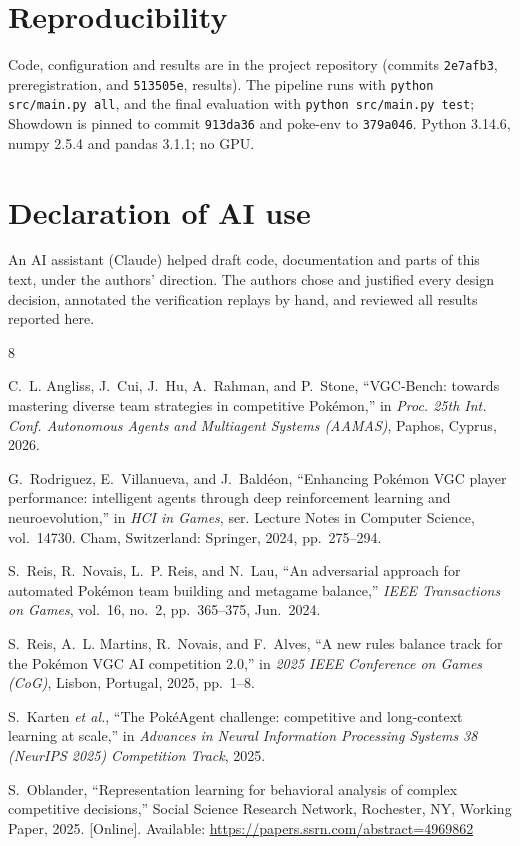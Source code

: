 \documentclass[conference]{IEEEtran}
\begin{document}
\section*{Reproducibility}
Code, configuration and results are in the project repository (commits \texttt{2e7afb3}, preregistration, and
\texttt{513505e}, results). The pipeline runs with \texttt{python src/main.py all}, and the final evaluation
with \texttt{python src/main.py test}; Showdown is pinned to commit \texttt{913da36} and poke-env to
\texttt{379a046}. Python 3.14.6, numpy 2.5.4 and pandas 3.1.1; no GPU.

\section*{Declaration of AI use}
An AI assistant (Claude) helped draft code, documentation and parts of this text, under the authors'
direction. The authors chose and justified every design decision, annotated the verification replays by hand,
and reviewed all results reported here.

\begin{thebibliography}{8}

C.~L. Angliss, J.~Cui, J.~Hu, A.~Rahman, and P.~Stone, ``VGC-Bench: towards mastering diverse team strategies in competitive Pok\'emon,''
in \emph{Proc. 25th Int. Conf. Autonomous Agents and Multiagent Systems (AAMAS)}, Paphos, Cyprus, 2026.

G.~Rodriguez, E.~Villanueva, and J.~Bald\'eon, ``Enhancing Pok\'emon VGC player performance: intelligent agents through deep reinforcement learning and neuroevolution,''
in \emph{HCI in Games}, ser. Lecture Notes in Computer Science, vol.~14730. Cham, Switzerland: Springer, 2024, pp.~275--294.

S.~Reis, R.~Novais, L.~P. Reis, and N.~Lau, ``An adversarial approach for automated Pok\'emon team building and metagame balance,''
\emph{IEEE Transactions on Games}, vol.~16, no.~2, pp.~365--375, Jun.~2024.

S.~Reis, A.~L. Martins, R.~Novais, and F.~Alves, ``A new rules balance track for the Pok\'emon VGC AI competition 2.0,''
in \emph{2025 IEEE Conference on Games (CoG)}, Lisbon, Portugal, 2025, pp.~1--8.

S.~Karten \emph{et al.}, ``The Pok\'eAgent challenge: competitive and long-context learning at scale,''
in \emph{Advances in Neural Information Processing Systems 38 (NeurIPS 2025) Competition Track}, 2025.

S.~Oblander, ``Representation learning for behavioral analysis of complex competitive decisions,''
Social Science Research Network, Rochester, NY, Working Paper, 2025. [Online]. Available: \url{https://papers.ssrn.com/abstract=4969862}

\end{thebibliography}
\end{document}
